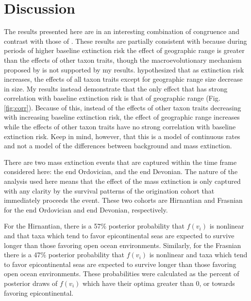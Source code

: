 \documentclass[12pt,letterpaper]{article}
\begin{document}
\section{Discussion}

The results presented here are in an interesting combination of congruence and contrast with those of \citet{Jablonski1986}.  These results are partially consistent with \citet{Jablonski1986} because during periods of higher baseline extinction risk the effect of geographic range is greater than the effects of other taxon traits, though the macroevolutionary mechanism proposed by \citet{Jablonski1986} is not supported by my results. \citet{Jablonski1986} hypothesized that as extinction risk increases, the effects of all taxon traits except for geographic range size decrease in size. My results instead demonstrate that the only effect that has strong correlation with baseline extinction risk is that of geographic range (Fig. \ref{fig:corr}). Because of this, instead of the effects of other taxon traits decreasing with increasing baseline extinction risk, the effect of geographic range increases while the effects of other taxon traits have no strong correlation with baseline extinction risk. Keep in mind, however, that this is a model of continuous rates and not a model of the differences between background and mass extinction.

There are two mass extinction events that are captured within the time frame considered here: the end Ordovician, and the end Devonian. The nature of the analysis used here means that the effect of the mass extinction is only captured with any clarity by the survival patterns of the origination cohort that immediately proceeds the event. These two cohorts are Hirnantian and Frasnian for the end Ordovician and end Devonian, respectively.

For the Hirnantian, there is a 57\% posterior probability that \(f(v_{i})\) is nonlinear and  that taxa which tend to favor epicontinental seas are expected to survive longer than those favoring open ocean environments. Similarly, for the Frasnian there is a 47\% posterior probability that \(f(v_{i})\) is nonlinear and taxa which tend to favor epicontinental seas are expected to survive longer than those favoring open ocean environments. These probabilities were calculated as the percent of posterior draws of \(f(v_{i})\) which have their optima greater than 0, or towards favoring epicontinental. 
\end{document}
